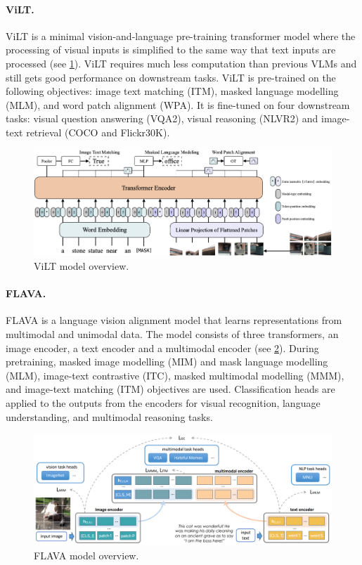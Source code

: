 \paragraph{ViLT.} ViLT \cite{kim2021vilt} is a minimal vision-and-language pre-training transformer model where the processing of visual inputs is simplified to the same way that text inputs are processed (see \cref{fig:vilt}). ViLT requires much less computation than previous VLMs and still gets good performance on downstream tasks. ViLT is pre-trained on the following objectives: image text matching (ITM), masked language modelling (MLM), and word patch alignment (WPA). It is fine-tuned on four downstream tasks: visual question answering (VQA2), visual reasoning (NLVR2) and image-text retrieval (COCO and Flickr30K).

\begin{figure}[ht]
    \centering
    \includegraphics[width=\linewidth]{images/models/vilt.png}
    \caption{ViLT model overview.}
    \label{fig:vilt}
\end{figure}

\paragraph{FLAVA.} FLAVA \cite{singh2022flava} is a language vision alignment model that learns representations from multimodal and unimodal data. The model consists of three transformers, an image encoder, a text encoder and a multimodal encoder (see \cref{fig:flava}). During pretraining, masked image modelling (MIM) and mask language modelling (MLM), image-text contrastive (ITC), masked multimodal modelling (MMM), and image-text matching (ITM) objectives are used. Classification heads are applied to the outputs from the encoders for visual recognition, language understanding, and multimodal reasoning tasks.

\begin{figure}[ht]
    \centering
    \includegraphics[width=\linewidth]{images/models/flava.png}
    \caption{FLAVA model overview.}
    \label{fig:flava}
\end{figure}

